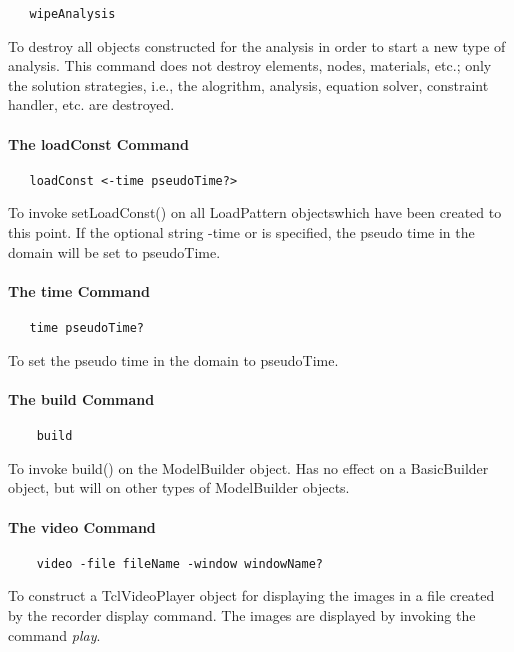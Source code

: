\documentclass[12pt]{article}
\begin{document}
{\sf\small
\begin{verbatim}
   wipeAnalysis
\end{verbatim}
}

\noindent To destroy all objects constructed for the analysis in order
to start a new type of analysis. This command does not destroy elements,
nodes, materials, etc.; only the solution strategies, i.e., the alogrithm,
analysis, equation solver, constraint handler, etc. are destroyed.

\paragraph {The loadConst Command}

{\sf\small
\begin{verbatim}
   loadConst <-time pseudoTime?>
\end{verbatim}
}

\noindent To invoke setLoadConst() on all LoadPattern objectswhich
have been created to this point. If the optional string -time or
is specified, the pseudo time in the domain will be set to pseudoTime.

\paragraph {The time Command}

{\sf\small
\begin{verbatim}
   time pseudoTime?
\end{verbatim}
}

\noindent To set the pseudo time in the domain to pseudoTime.

\paragraph {The build Command}

{\sf\small
\begin{verbatim}
    build
\end{verbatim}
}

\noindent To invoke build() on the ModelBuilder object. Has no effect
on a BasicBuilder object, but will on other types of ModelBuilder objects.

\paragraph {The video Command}

{\sf\small
\begin{verbatim}
    video -file fileName -window windowName?
\end{verbatim}
}

\noindent To construct a TclVideoPlayer object for displaying the images in a file
created by the recorder display command. The images are displayed by invoking the 
command {\em play}.
\end{document}
